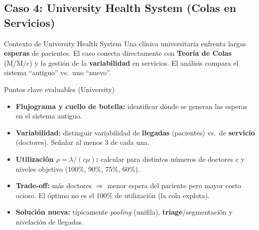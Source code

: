 \subsection[Caso: University Health]{Caso 4: University Health System (Colas en Servicios)}

\begin{definicion}{Contexto de University Health System}
Una clínica universitaria enfrenta largas \textbf{esperas} de pacientes. El caso conecta directamente con \textbf{Teoría de Colas} (M/M/c) y la gestión de la \textbf{variabilidad} en servicios. El análisis compara el sistema ``antiguo'' vs.\ uno ``nuevo''.
\end{definicion}

\begin{definicion}{Puntos clave evaluables (University)}
\begin{itemize}[leftmargin=1.4em, itemsep=1pt]
  \item \textbf{Flujograma y cuello de botella:} identificar dónde se generan las esperas en el sistema antiguo.
  \item \textbf{Variabilidad:} distinguir variabilidad de \textbf{llegadas} (pacientes) vs.\ de \textbf{servicio} (doctores). Señalar al menos 3 de cada una.
  \item \textbf{Utilización $\rho = \lambda/(c\mu)$:} calcular para distintos números de doctores $c$ y niveles objetivo (100\%, 90\%, 75\%, 60\%).
  \item \textbf{Trade-off:} más doctores $\Rightarrow$ menor espera del paciente pero mayor costo ocioso. El óptimo no es el 100\% de utilización (la cola explota).
  \item \textbf{Solución nueva:} típicamente \textit{pooling} (unifila), \textbf{triage}/segmentación y nivelación de llegadas.
\end{itemize}
\end{definicion}

